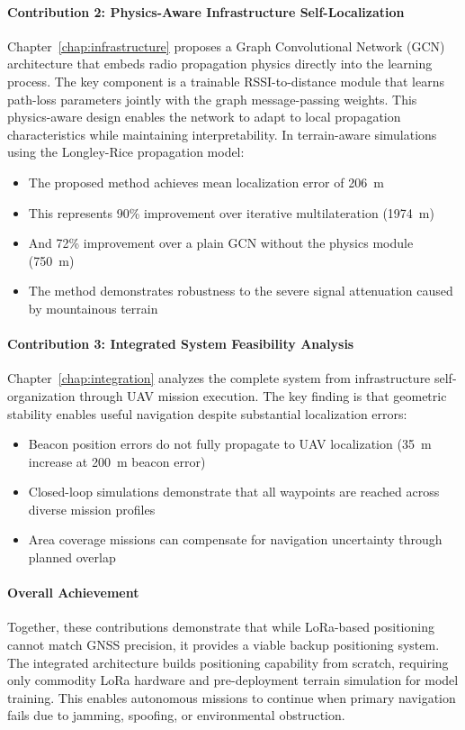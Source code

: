 \documentclass[master,final,11pt]{iscs-thesis}
\begin{document}
\paragraph{Contribution 2: Physics-Aware Infrastructure Self-Localization}
Chapter~\ref{chap:infrastructure} proposes a Graph Convolutional Network (GCN) architecture that embeds radio propagation physics directly into the learning process.
The key component is a trainable RSSI-to-distance module that learns path-loss parameters jointly with the graph message-passing weights.
This physics-aware design enables the network to adapt to local propagation characteristics while maintaining interpretability.
In terrain-aware simulations using the Longley-Rice propagation model:
\begin{itemize}
    \item The proposed method achieves mean localization error of 206~m
    \item This represents 90\% improvement over iterative multilateration (1974~m)
    \item And 72\% improvement over a plain GCN without the physics module (750~m)
    \item The method demonstrates robustness to the severe signal attenuation caused by mountainous terrain
\end{itemize}

\paragraph{Contribution 3: Integrated System Feasibility Analysis}
Chapter~\ref{chap:integration} analyzes the complete system from infrastructure self-organization through UAV mission execution.
The key finding is that geometric stability enables useful navigation despite substantial localization errors:
\begin{itemize}
    \item Beacon position errors do not fully propagate to UAV localization (35~m increase at 200~m beacon error)
    \item Closed-loop simulations demonstrate that all waypoints are reached across diverse mission profiles
    \item Area coverage missions can compensate for navigation uncertainty through planned overlap
\end{itemize}

\paragraph{Overall Achievement}
Together, these contributions demonstrate that while LoRa-based positioning cannot match GNSS precision, it provides a viable backup positioning system.
The integrated architecture builds positioning capability from scratch, requiring only commodity LoRa hardware and pre-deployment terrain simulation for model training.
This enables autonomous missions to continue when primary navigation fails due to jamming, spoofing, or environmental obstruction.
\end{document}
